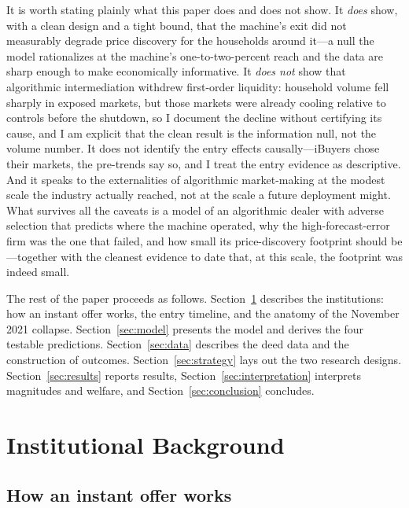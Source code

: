 \documentclass[12pt, letterpaper]{article}
\theoremstyle{remark}
\begin{document}
It is worth stating plainly what this paper does and does not show. It \emph{does} show, with a clean design and a tight bound, that the machine's exit did not measurably degrade price discovery for the households around it---a null the model rationalizes at the machine's one-to-two-percent reach and the data are sharp enough to make economically informative. It \emph{does not} show that algorithmic intermediation withdrew first-order liquidity: household volume fell sharply in exposed markets, but those markets were already cooling relative to controls before the shutdown, so I document the decline without certifying its cause, and I am explicit that the clean result is the information null, not the volume number. It does not identify the entry effects causally---iBuyers chose their markets, the pre-trends say so, and I treat the entry evidence as descriptive. And it speaks to the externalities of algorithmic market-making at the modest scale the industry actually reached, not at the scale a future deployment might. What survives all the caveats is a model of an algorithmic dealer with adverse selection that predicts where the machine operated, why the high-forecast-error firm was the one that failed, and how small its price-discovery footprint should be---together with the cleanest evidence to date that, at this scale, the footprint was indeed small.

The rest of the paper proceeds as follows. Section~\ref{sec:institutions} describes the institutions: how an instant offer works, the entry timeline, and the anatomy of the November 2021 collapse. Section~\ref{sec:model} presents the model and derives the four testable predictions. Section~\ref{sec:data} describes the deed data and the construction of outcomes. Section~\ref{sec:strategy} lays out the two research designs. Section~\ref{sec:results} reports results, Section~\ref{sec:interpretation} interprets magnitudes and welfare, and Section~\ref{sec:conclusion} concludes.

\section{Institutional Background}\label{sec:institutions}

\subsection{How an instant offer works}\label{sec:inst-mechanics}
\end{document}
